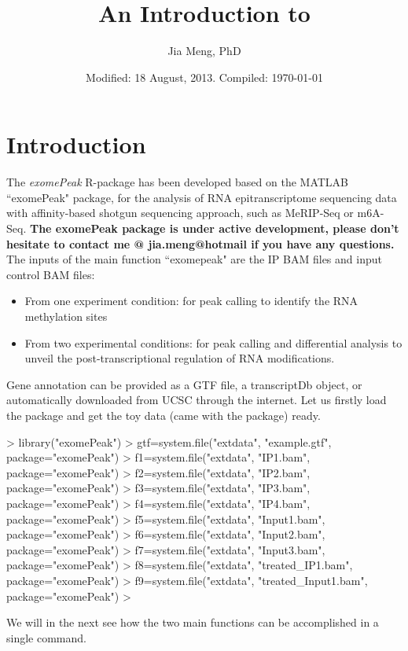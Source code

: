 \documentclass[]{article}
\title{An Introduction to \Rpackage{exomePeak}}
\author{Jia Meng, PhD}
\date{Modified: 18 August, 2013. Compiled: \today}
\newcommand{\Rpackage}[1]{{\textit{#1}}}
\newcommand{\exomePeak}{\Rpackage{exomePeak}}
\begin{document}


\maketitle


\section{Introduction}

The \exomePeak{} R-package has been developed based on the MATLAB ``exomePeak" package, 
for the analysis of RNA epitranscriptome sequencing data with affinity-based shotgun sequencing approach, such as MeRIP-Seq or m6A-Seq. 
\textbf{The exomePeak package is under active development, please don't hesitate to contact me @ jia.meng@hotmail if you have any questions.} The inputs of the main function ``exomepeak" are the IP BAM files and input control BAM files:
\begin{itemize}
  \item From one experiment condition: for peak calling to identify the RNA methylation sites
  \item From two experimental conditions: for peak calling and differential analysis to unveil the post-transcriptional regulation of RNA modifications.
\end{itemize}
Gene annotation can be provided as a GTF file, a transcriptDb object, or automatically downloaded from UCSC through the internet. Let us firstly load the package and get the toy data (came with the package) ready.

\begin{Schunk}
\begin{Sinput}
> library("exomePeak")
> gtf=system.file("extdata", "example.gtf", package="exomePeak")
> f1=system.file("extdata", "IP1.bam", package="exomePeak")
> f2=system.file("extdata", "IP2.bam", package="exomePeak")
> f3=system.file("extdata", "IP3.bam", package="exomePeak")
> f4=system.file("extdata", "IP4.bam", package="exomePeak")
> f5=system.file("extdata", "Input1.bam", package="exomePeak")
> f6=system.file("extdata", "Input2.bam", package="exomePeak")
> f7=system.file("extdata", "Input3.bam", package="exomePeak")
> f8=system.file("extdata", "treated_IP1.bam", package="exomePeak")
> f9=system.file("extdata", "treated_Input1.bam", package="exomePeak")
> 
\end{Sinput}
\end{Schunk}

We will in the next see how the two main functions can be accomplished in a single command. 
\end{document}
